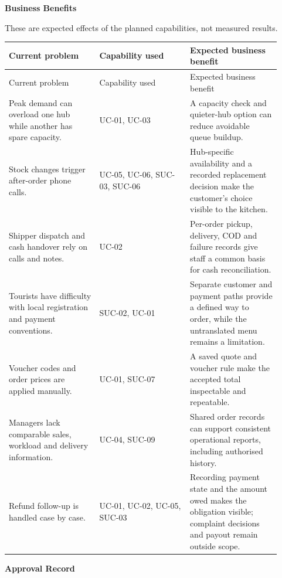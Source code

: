 \textbf{Business Benefits}

These are expected effects of the planned capabilities, not measured results.

\begin{longtable}{>{\raggedright\arraybackslash}p{0.3067\linewidth}>{\raggedright\arraybackslash}p{0.3067\linewidth}>{\raggedright\arraybackslash}p{0.3067\linewidth}}
Current problem & Capability used & Expected business benefit \\
\hline\endfirsthead
Current problem & Capability used & Expected business benefit \\
\hline\endhead
Peak demand can overload one hub while another has spare capacity. & UC-01, UC-03 & A capacity check and quieter-hub option can reduce avoidable queue buildup. \\
Stock changes trigger after-order phone calls. & UC-05, UC-06, SUC-03, SUC-06 & Hub-specific availability and a recorded replacement decision make the customer's choice visible to the kitchen. \\
Shipper dispatch and cash handover rely on calls and notes. & UC-02 & Per-order pickup, delivery, COD and failure records give staff a common basis for cash reconciliation. \\
Tourists have difficulty with local registration and payment conventions. & SUC-02, UC-01 & Separate customer and payment paths provide a defined way to order, while the untranslated menu remains a limitation. \\
Voucher codes and order prices are applied manually. & UC-01, SUC-07 & A saved quote and voucher rule make the accepted total inspectable and repeatable. \\
Managers lack comparable sales, workload and delivery information. & UC-04, SUC-09 & Shared order records can support consistent operational reports, including authorised history. \\
Refund follow-up is handled case by case. & UC-01, UC-02, UC-05, SUC-03 & Recording payment state and the amount owed makes the obligation visible; complaint decisions and payout remain outside scope. \\
\end{longtable}
\textbf{Approval Record}


